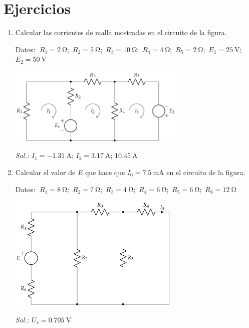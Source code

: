\section*{Ejercicios}

\begin{enumerate}
\item Calcular las corrientes de malla mostradas en el circuito de la
  figura.
  
  Datos: $\; R_1 = \qty{2}{\ohm}$;\, $R_2 = \qty{5}{\ohm}$;\, $R_3 = \qty{10}{\ohm}$;\, $R_4 = \qty{4}{\ohm}$;\, $R_5 = \qty{2}{\ohm}$;\, $E_1 = \qty{25}{\volt}$;\, $E_2 = \qty{50}{\volt}$

  \begin{center}
    \includegraphics[height=3.7cm]{../figs/ej2_BT1.pdf}
  \end{center}

  \emph{Sol.:\; $I_1=\qty{-1.31}{\ampere};\, I_2=\qty{3.17}{\ampere};\, \qty{10.45}{\ampere}$}
		
\item Calcular el valor de $E$ que hace que $I_0=\qty{7.5}{\milli\ampere}$ en el
  circuito de la figura.

  Datos: $\; R_1 = \qty{8}{\ohm}$;\, $R_2 = \qty{7}{\ohm}$;\, $R_3 = \qty{4}{\ohm}$;\, $R_4 = \qty{6}{\ohm}$;\, $R_5 = \qty{6}{\ohm}$;\, $R_6 = \qty{12}{\ohm}$ 
  
  \begin{center}
    \includegraphics[height=5.5cm]{../figs/ej3_BT1.pdf}
  \end{center}
  
  \emph{Sol.:\; $U_s=\qty{0.705}{\volt}$}
		

\end{enumerate}
